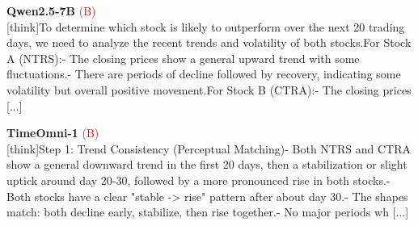 \noindent
\begin{minipage}[t]{0.28\textwidth}
\colorbox{red!8}{\parbox{\dimexpr\textwidth-2\fboxsep}{
\textbf{Qwen2.5-7B} \textcolor{red}{(B)} \\[2pt]
\tiny
[think]\newline To determine which stock is likely to outperform over the next 20 trading days, we need to analyze the recent trends and volatility of both stocks.\newline For Stock A (NTRS):\newline - The closing prices show a general upward trend with some fluctuations.\newline - There are periods of decline followed by recovery, indicating some volatility but overall positive movement.\newline For Stock B (CTRA):\newline - The closing prices [...]
}}
\end{minipage}
\hfill
\begin{minipage}[t]{0.28\textwidth}
\colorbox{red!8}{\parbox{\dimexpr\textwidth-2\fboxsep}{
\textbf{TimeOmni-1} \textcolor{red}{(B)} \\[2pt]
\tiny
[think]\newline Step 1: Trend Consistency (Perceptual Matching)\newline - Both NTRS and CTRA show a general downward trend in the first  20 days, then a stabilization or slight uptick around day 20-30, followed by a more pronounced rise in both stocks.\newline - Both stocks have a clear "stable -> rise" pattern after about day 30.\newline - The shapes match: both decline early, stabilize, then rise together.\newline - No major periods wh [...]
}}
\end{minipage}
\hfill
